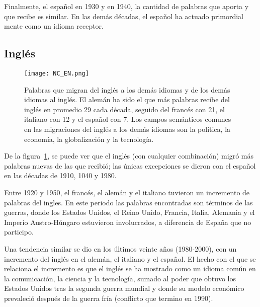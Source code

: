 Finalmente, el español en 1930 y en 1940, la cantidad de palabras que aporta y
que recibe es similar.  En las demás décadas, el español ha actuado primordial
mente como un idioma receptor. 

\subsection{Inglés} %

\begin{figure} [h!] %
	\centering
	\texttt{[image: NC\_EN.png]}
	\caption{Palabras que migran del inglés a los demás idiomas y de los demás idiomas al inglés. El alemán ha sido el que más palabras recibe del inglés en promedio 29 cada década, seguido del francés con 21, el italiano con 12 y el español con 7. Los campos semánticos comunes en las migraciones del inglés a los demás idiomas son la política, la economía, la globalización y la tecnología.}
	\label{fig.NC_EN}
\end{figure} %


De la figura~\ref{fig.NC_EN}, se puede ver que el inglés (con cualquier combinación) migró más palabras nuevas de las que recibió; las únicas excepciones se dieron  con el español en las décadas de 1910, 1040 y 1980. 

Entre 1920 y 1950, el francés, el alemán y el italiano tuvieron un incremento de palabras del ingles. En este periodo las palabras encontradas son términos de las guerras, donde los Estados Unidos, el Reino Unido, Francia, Italia, Alemania y  el Imperio Austro-Húngaro estuvieron involucrados, a diferencia de España que no participo.   

Una tendencia similar se dio en los últimos veinte años (1980-2000), con un incremento del inglés en el alemán, el italiano y el español. El hecho con el que se relaciona el incremento es que el inglés se ha mostrado como un idioma común en la comunicación, la ciencia y la tecnología,  sumado al poder que obtuvo los Estados Unidos tras la segunda guerra mundial y donde su modelo económico prevaleció después de la guerra fría (conflicto que termino en 1990). 



